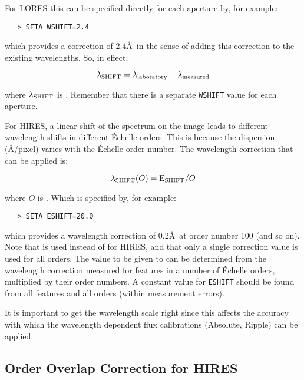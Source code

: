 For LORES this can be specified directly for each aperture by, for example:

\begin{verbatim}
   > SETA WSHIFT=2.4
\end{verbatim}

which provides a correction of 2.4\AA\ in the sense of adding this
correction to the existing wavelengths.  So, in effect:

\begin{displaymath}
\lambda_{\rm SHIFT} = \lambda_{\rm laboratory} - \lambda_{\rm measured}
\end{displaymath}

where $\lambda_{\rm SHIFT}$ is \@.
Remember that there is a separate \verb+WSHIFT+ value for each aperture.

For HIRES, a linear shift of the spectrum on the image leads to different
wavelength shifts in different \'{E}chelle orders.  This is because the
dispersion (\AA /pixel) varies with the \'{E}chelle order number.  The
wavelength correction that can be applied is:

\begin{displaymath}
\lambda_{\rm SHIFT}(O) = {\rm E}_{\rm SHIFT} / O
\end{displaymath}

where $O$ is \@.
Which is specified by, for example:

\begin{verbatim}
   > SETA ESHIFT=20.0
\end{verbatim}

which provides a wavelength correction of 0.2\AA\ at order number 100 (and so
on)\@.  Note that 
 is used instead of 
 for HIRES, and
that only a single correction value is used for all orders.  The value to be
given to 
 can be determined from the wavelength correction
measured for features in a number of \'{E}chelle orders, multiplied by their
order numbers.  A constant value for \verb+ESHIFT+ should be found from all
features and all orders (within measurement errors)\@.

It is important to get the wavelength scale right since this affects the
accuracy with which the wavelength dependent flux calibrations (Absolute,
Ripple) can be applied.


\subsection{Order Overlap Correction for HIRES}

